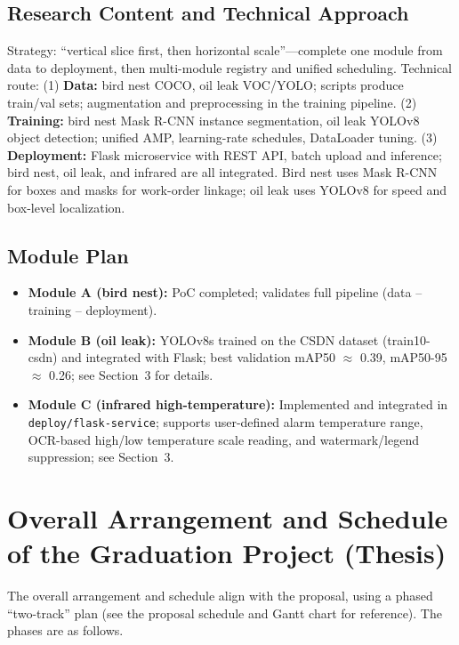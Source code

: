 \documentclass[12pt,a4paper]{article}
\begin{document}
\subsection{Research Content and Technical Approach}

Strategy: ``vertical slice first, then horizontal scale''---complete one module from data to deployment, then multi-module registry and unified scheduling. Technical route: (1) \textbf{Data:} bird nest COCO, oil leak VOC/YOLO; scripts produce train/val sets; augmentation and preprocessing in the training pipeline. (2) \textbf{Training:} bird nest Mask R-CNN instance segmentation, oil leak YOLOv8 object detection; unified AMP, learning-rate schedules, DataLoader tuning. (3) \textbf{Deployment:} Flask microservice with REST API, batch upload and inference; bird nest, oil leak, and infrared are all integrated. Bird nest uses Mask R-CNN for boxes and masks for work-order linkage; oil leak uses YOLOv8 for speed and box-level localization.

\subsection{Module Plan}

\begin{itemize}
  \item \textbf{Module A (bird nest):} PoC completed; validates full pipeline (data -- training -- deployment).
  \item \textbf{Module B (oil leak):} YOLOv8s trained on the CSDN dataset (train10-csdn) and integrated with Flask; best validation mAP50 $\approx$ 0.39, mAP50-95 $\approx$ 0.26; see Section~3 for details.
  \item \textbf{Module C (infrared high-temperature):} Implemented and integrated in \texttt{deploy/flask-service}; supports user-defined alarm temperature range, OCR-based high/low temperature scale reading, and watermark/legend suppression; see Section~3.
\end{itemize}

\section{Overall Arrangement and Schedule of the Graduation Project (Thesis)}

The overall arrangement and schedule align with the proposal, using a phased ``two-track'' plan (see the proposal schedule and Gantt chart for reference). The phases are as follows.
\end{document}
